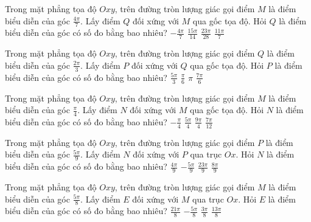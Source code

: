 \documentclass[12pt,a4paper]{article}
\begin{document}
\begin{ex}
   Trong mặt phẳng tọa độ ${Oxy}$, trên đường tròn lượng giác gọi điểm ${M}$ là điểm biểu diễn của góc $\frac{4 \pi}{7}$. Lấy điểm ${Q}$ đối xứng với ${M}$ qua gốc tọa độ. Hỏi ${Q}$ là điểm biểu diễn của góc có số đo bằng bao nhiêu? 
\choice
{ $- \frac{4 \pi}{7}$ }
   { $\frac{15 \pi}{14}$ }
     { $\frac{23 \pi}{28}$ }
    { \True $\frac{11 \pi}{7}$ }
\end{ex}

\begin{ex}
   Trong mặt phẳng tọa độ ${Oxy}$, trên đường tròn lượng giác gọi điểm ${Q}$ là điểm biểu diễn của góc $\frac{2 \pi}{3}$. Lấy điểm ${P}$ đối xứng với ${Q}$ qua gốc tọa độ. Hỏi ${P}$ là điểm biểu diễn của góc có số đo bằng bao nhiêu? 
\choice
{ \True $\frac{5 \pi}{3}$ }
   { $\frac{\pi}{6}$ }
     { $\pi$ }
    { $\frac{7 \pi}{6}$ }
\end{ex}

\begin{ex}
   Trong mặt phẳng tọa độ ${Oxy}$, trên đường tròn lượng giác gọi điểm ${M}$ là điểm biểu diễn của góc $\frac{\pi}{4}$. Lấy điểm ${N}$ đối xứng với ${M}$ qua gốc tọa độ. Hỏi ${N}$ là điểm biểu diễn của góc có số đo bằng bao nhiêu? 
\choice
{ $- \frac{\pi}{4}$ }
   { \True $\frac{5 \pi}{4}$ }
     { $\frac{9 \pi}{4}$ }
    { $\frac{7 \pi}{12}$ }
\end{ex}

\begin{ex}
   Trong mặt phẳng tọa độ ${Oxy}$, trên đường tròn lượng giác gọi điểm ${P}$ là điểm biểu diễn của góc $\frac{5 \pi}{9}$. Lấy điểm ${N}$ đối xứng với ${P}$ qua trục ${Ox}$. Hỏi ${N}$ là điểm biểu diễn của góc có số đo bằng bao nhiêu? 
\choice
{ $\frac{4 \pi}{9}$ }
   { \True $- \frac{5 \pi}{9}$ }
     { $\frac{23 \pi}{9}$ }
    { $\frac{8 \pi}{9}$ }
\end{ex}

\begin{ex}
   Trong mặt phẳng tọa độ ${Oxy}$, trên đường tròn lượng giác gọi điểm ${M}$ là điểm biểu diễn của góc $\frac{5 \pi}{8}$. Lấy điểm ${E}$ đối xứng với ${M}$ qua trục ${Ox}$. Hỏi ${E}$ là điểm biểu diễn của góc có số đo bằng bao nhiêu? 
\choice
{ $\frac{21 \pi}{8}$ }
   { \True $- \frac{5 \pi}{8}$ }
     { $\frac{3 \pi}{8}$ }
    { $\frac{13 \pi}{8}$ }
\end{ex}
\end{document}
